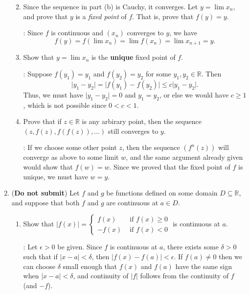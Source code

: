 \documentclass[letterpaper,12pt]{article}
\newcommand{\R}{\mathbb{R}}
\renewcommand{\ss}{\subseteq}
\newcommand{\abs}[1]{\lvert #1\rvert}
\begin{document}
\begin{enumerate}
\begin{enumerate}
\bigskip

 \item Since the sequence in part (b) is Cauchy, it converges. Let $y=\lim x_n$, and prove that $y$ is a {\em fixed point} of $f$. That is, prove that $f(y)=y$.

\bigskip

: Since $f$ is continuous and $(x_n)$ converges to $y$, we have
\[
 f(y) = f(\lim x_n) = \lim f(x_n) = \lim x_{n+1} = y.
\]


\bigskip

 \item Show that $y=\lim x_n$ is the {\bf unique} fixed point of $f$.

\bigskip 

: Suppose $f(y_1)=y_1$ and $f(y_2)=y_2$ for some $y_1,y_2\in\R$. Then 
\[
 \abs{y_1-y_2} = \abs{f(y_1)-f(y_2)} \leq c\abs{y_1-y_2}.
\]
Thus, we must have $\abs{y_1-y_2}=0$ and $y_1=y_2$, or else we would have $c\geq 1$, which is not possible since $0<c<1$.

\bigskip

 \item Prove that if $z\in \R$ is any arbirary point, then the sequence $(z,f(z),f(f(z)),\ldots)$ still converges to $y$.

\bigskip

: If we choose some other point $z$, then the sequence $(f^n(z))$ will converge as above to some limit $w$, and the same argument already given would show that $f(w)=w$. Since we proved that the fixed point of $f$ is unique, we must have $w=y$.

\bigskip

\end{enumerate}
\item ({\bf Do not submit}) Let $f$ and $g$ be functions defined on some domain $D\ss\R$, and suppose that both $f$ and $g$ are 
continuous at $a\in D$.
\begin{enumerate}
 \item Show that $\displaystyle \abs{f(x)} = \begin{cases}f(x) & \text{ if } f(x)\geq 0\\ -f(x) & \text{ if } f(x)<0\end{cases}$ is continuous at $a$.

\bigskip

: Let $\epsilon>0$ be given. Since $f$ is continuous at $a$, there exists some $\delta>0$ such that if $\abs{x-a}<\delta$, then $\abs{f(x)-f(a)}<\epsilon$. If $f(a)\neq 0$ then we can choose $\delta$ small enough that $f(x)$ and $f(a)$ have the same sign when $\abs{x-a}<\delta$, and continuity of $\abs{f}$ follows from the continuity of $f$ (and $-f$).


\end{enumerate}
\end{enumerate}
\end{document}
